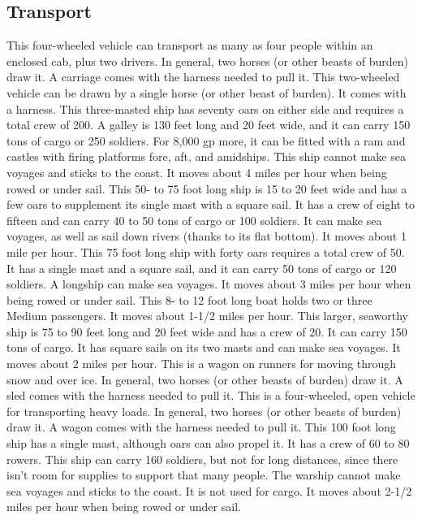 \subsection{Transport}
 This four-wheeled vehicle can transport as many as four people within an enclosed cab, plus two drivers. In general, two horses (or other beasts of burden) draw it. A carriage comes with the harness needed to pull it.
 This two-wheeled vehicle can be drawn by a single horse (or other beast of burden). It comes with a harness.
 This three-masted ship has seventy oars on either side and requires a total crew of 200. A galley is 130 feet long and 20 feet wide, and it can carry 150 tons of cargo or 250 soldiers. For 8,000 gp more, it can be fitted with a ram and castles with firing platforms fore, aft, and amidships. This ship cannot make sea voyages and sticks to the coast. It moves about 4 miles per hour when being rowed or under sail.
 This 50- to 75 foot long ship is 15 to 20 feet wide and has a few oars to supplement its single mast with a square sail. It has a crew of eight to fifteen and can carry 40 to 50 tons of cargo or 100 soldiers. It can make sea voyages, as well as sail down rivers (thanks to its flat bottom). It moves about 1 mile per hour.
 This 75 foot long ship with forty oars requires a total crew of 50. It has a single mast and a square sail, and it can carry 50 tons of cargo or 120 soldiers. A longship can make sea voyages. It moves about 3 miles per hour when being rowed or under sail.
 This 8- to 12 foot long boat holds two or three Medium passengers. It moves about 1-1/2 miles per hour.
 This larger, seaworthy ship is 75 to 90 feet long and 20 feet wide and has a crew of 20. It can carry 150 tons of cargo. It has square sails on its two masts and can make sea voyages. It moves about 2 miles per hour.
 This is a wagon on runners for moving through snow and over ice. In general, two horses (or other beasts of burden) draw it. A sled comes with the harness needed to pull it.
 This is a four-wheeled, open vehicle for transporting heavy loads. In general, two horses (or other beasts of burden) draw it. A wagon comes with the harness needed to pull it.
 This 100 foot long ship has a single mast, although oars can also propel it. It has a crew of 60 to 80 rowers. This ship can carry 160 soldiers, but not for long distances, since there isn't room for supplies to support that many people. The warship cannot make sea voyages and sticks to the coast. It is not used for cargo. It moves about 2-1/2 miles per hour when being rowed or under sail.

